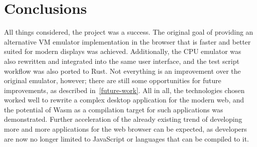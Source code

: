 \section{Conclusions}
All things considered, the project was a success. The original goal of providing an alternative VM emulator implementation in the browser that is faster and better suited for modern displays was achieved.
Additionally, the CPU emulator was also rewritten and integrated into the same user interface, and the test script workflow was also ported to Rust.
Not everything is an improvement over the original emulator, however; there are still some opportunities for future improvements, as described in~\cref{future-work}.
All in all, the technologies chosen worked well to rewrite a complex desktop application for the modern web, and the potential of Wasm as a compilation target for such applications was demonstrated.
Further acceleration of the already existing trend of developing more and more applications for the web browser can be expected, as developers are now no longer limited to JavaScript or languages that can be compiled to it.


